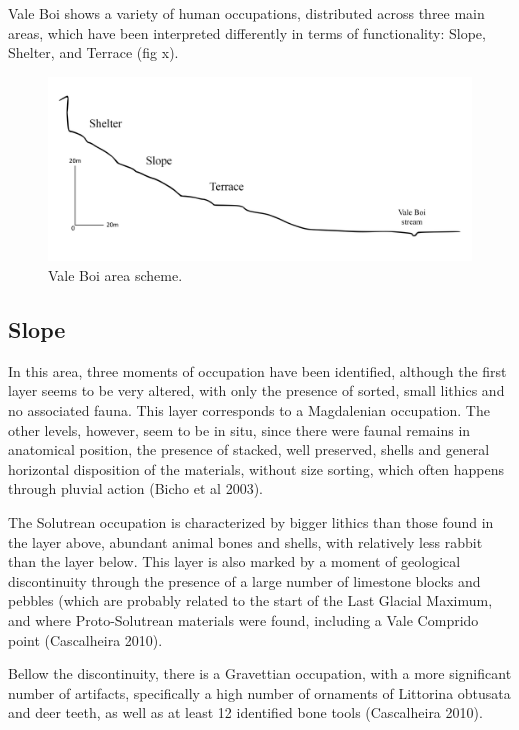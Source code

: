 \documentclass[12pt,twoside]{reedthesis}
\begin{document}
Vale Boi shows a variety of human occupations, distributed across three main areas, which have been interpreted differently in terms of functionality: Slope, Shelter, and Terrace (fig x).
\begin{figure}
\includegraphics[width=1\linewidth]{figure/Valeboi_areas} \caption{Vale Boi area scheme.}\label{fig:unnamed-chunk-5}
\end{figure}
\hypertarget{slope}{%
\subsection{Slope}\label{slope}}

In this area, three moments of occupation have been identified, although the first layer seems to be very altered, with only the presence of sorted, small lithics and no associated fauna. This layer corresponds to a Magdalenian occupation. The other levels, however, seem to be in situ, since there were faunal remains in anatomical position, the presence of stacked, well preserved, shells and general horizontal disposition of the materials, without size sorting, which often happens through pluvial action (Bicho et al 2003).

The Solutrean occupation is characterized by bigger lithics than those found in the layer above, abundant animal bones and shells, with relatively less rabbit than the layer below. This layer is also marked by a moment of geological discontinuity through the presence of a large number of limestone blocks and pebbles (which are probably related to the start of the Last Glacial Maximum, and where Proto-Solutrean materials were found, including a Vale Comprido point (Cascalheira 2010).

Bellow the discontinuity, there is a Gravettian occupation, with a more significant number of artifacts, specifically a high number of ornaments of Littorina obtusata and deer teeth, as well as at least 12 identified bone tools (Cascalheira 2010).
\end{document}
